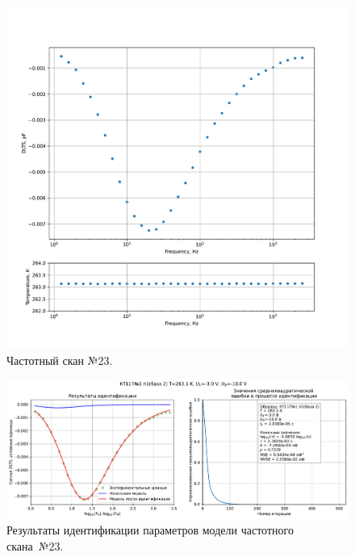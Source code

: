\begin{figure}[!ht]
    \centering
    \includegraphics[width=1\textwidth]{../plots/КТ117№1_п1(база 2)_2500Гц-1Гц_1пФ_-10С_-3В-10В_100мВ_20мкс_шаг_0,1.pdf}
    \caption{Частотный скан №23.}
    \label{pic:frequency_scan_23}
\end{figure}

\begin{figure}[!ht]
    \centering
    \includegraphics[width=1\textwidth]{../plots/КТ117№1_п1(база 2)_2500Гц-1Гц_1пФ_-10С_-3В-10В_100мВ_20мкс_шаг_0,1_model.pdf}
    \caption{Результаты идентификации параметров модели частотного скана~№23.}
    \label{pic:frequency_scan_model23}
\end{figure}

\pagebreak


